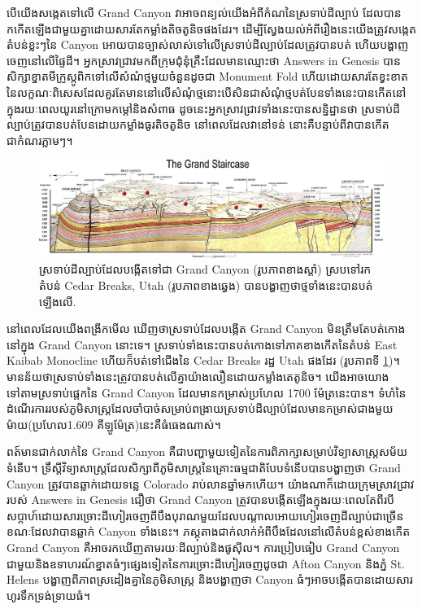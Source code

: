 \documentclass[10pt,twocolumn,letterpaper]{article}
\begin{document}
បើយើងសង្កេតទៅលើ Grand Canyon វាអាចពន្យល់យើងអំពីកំណនៃស្រទាប់ដីល្បាប់ ដែលបានកកើតឡើងជាមួយគ្នាដោយសារតែកម្លាំងតិចតូនិចផងដែរ។ ដើម្បីស្វែងយល់អំពីរឿងនេះយើងត្រូវសង្កេតតំបន់ខ្លះៗនៃ Canyon អោយបានច្បាស់លាស់ទៅលើស្រទាប់ដីល្បាប់ដែលត្រូវបានបត់ ហើយបង្ហាញចេញនៅលើផ្ទៃដី។ អ្នកស្រាវជ្រាវមកពីក្រុមជុំនុំគ្រឺះដែលមានឈ្មោះថា Answers in Genesis\cite{42} បានសិក្សាខ្នាតមីក្រូស្កូពិកទៅលើសំណំថ្មមួយចំនួនដូចជា Monument Fold ហើយដោយសារតែខ្វះខាតនៃលក្ខណៈពិសេសដែលគួរតែមាននៅលើសំណុំថ្មនោះបើសិនជាសំណុំថ្មបត់បែនទាំងនេះបានកើតនៅក្នុងរយៈពេលយូរនៅក្រោមកម្តៅនិងសំពាធ ដូចនេះអ្នកស្រាវជ្រាវទាំងនេះបានសន្និដ្ឋានថា ស្រទាប់ដីល្បាប់ត្រូវបានបត់បែនដោយកម្លាំងធូរតិចតូនិច នៅពេលដែលវានៅទន់ នោះគឺបន្ទាប់ពីវាបានកើតជាកំណរភ្លាមៗ\cite{43}។

\begin{figure}
\begin{center}
\includegraphics[width=1\textwidth]{Grand_Staircase-big.jpg}
\end{center}
   \caption{ស្រទាប់ដីល្បាប់ដែលបង្កើតទៅជា Grand Canyon (រូបភាពខាងស្តាំ) ស្របទៅរកតំបន់ Cedar Breaks, Utah (រូបភាពខាងឆ្វេង) បានបង្ហាញថាថ្មទាំងនេះបានបត់ឡើងលើ\cite{50}.}
\label{fig:4}
\end{figure}

នៅពេលដែលយើងពង្រីកមើល ឃើញថាស្រទាប់ដែលបង្កើត Grand Canyon មិនត្រឹមតែបត់កោងនៅក្នុង Grand Canyon នោះទេ។ ស្រទាប់ទាំងនេះបានបត់កោងទៅភាគខាងកើតនៃតំបន់ East Kaibab Monocline\cite{46} ហើយក៏បត់ទៅជើងនៃ Cedar Breaks រដ្ឋ Utah ផងដែរ (រូបភាពទី \ref{fig:4})។ មានន័យថាស្រទាប់ទាំងនេះត្រូវបានបត់លើគ្នាយ៉ាងលឿនដោយកម្លាំងតេតូនិច។ យើងអាចយោងទៅតាមស្រទាប់ផ្តេកនៃ Grand Canyon ដែលមានកម្រាស់ប្រហែល 1700 ម៉ែត្រនេះបាន។ ទំហំនៃដំណើរការរបស់ភូមិសាស្ត្រដែលចាំបាច់សម្រាប់ពង្រាយស្រទាប់ដីល្បាប់ដែលមានកម្រាស់ជាងមួយម៉ាយ(ប្រហែល1.609 គីឡូម៉ែត្រ)នេះគឺធំធេងណាស់។ 

ពត៍មានជាក់លាក់នៃ Grand Canyon គឺជាបញ្ហាមួយទៀតនៃការពិភាក្សាសម្រាប់វិទ្យាសាស្ត្រសម័យទំនើប។ ទ្រឹស្តីវិទ្យាសាស្ត្រដែលសិក្សាពីភូមិសាស្ត្រនៃគ្រោះធម្មជាតិបែបទំនើបបានបង្ហាញថា Grand Canyon ត្រូវបានឆ្លាក់ដោយទន្លេ Colorado រាប់លានឆ្នាំមកហើយ\cite{47}។ យ៉ាងណាក៏ដោយក្រុមស្រាវជ្រាវរបស់ Answers in Genesis ជឿថា Grand Canyon ត្រូវបានបង្កើតឡើងក្នុងរយៈពេលតែពីរបីសប្តាហ៍ដោយសារច្រោះដីហៀរចេញពីបឹងបុរាណមួយដែលបណ្តាលអោយហៀរចេញដីល្បាប់ជាច្រើន ខណៈដែលវាបានឆ្លាក់ Canyon ទាំងនេះ។ ភស្តុតាងជាក់លាក់អំពីបឹងដែលនៅលើតំបន់ខ្ពស់ខាងកើត Grand Canyon គឺអាចរកឃើញតាមរយៈដីល្បាប់និងផូសុីល។ ការប្រៀបធៀប Grand Canyon ជាមួយនិងឧទាហរណ៍ខ្នាតធំៗផ្សេងទៀតនៃការច្រោះដីហៀរចេញដូចជា Afton Canyon និងភ្នំ St. Helens បង្ហាញពីភាពស្រដៀងគ្នានៃភូមិសាស្ត្រ និងបង្ហាញថា Canyon ធំៗអាចបង្កើតបានដោយសារហូរទឹកទ្រង់ទ្រាយធំ\cite{48}។
\end{document}
